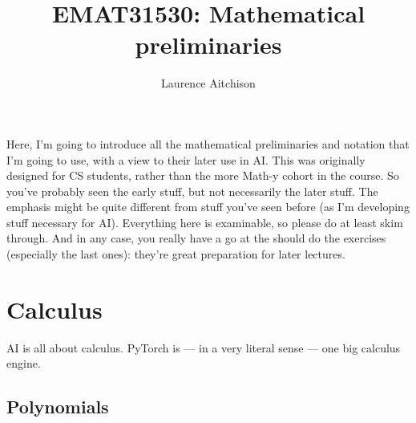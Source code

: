 \documentclass{article}
\title{EMAT31530: Mathematical preliminaries}
\author{Laurence Aitchison}
\date{}
\begin{document}
\maketitle

Here, I'm going to introduce all the mathematical preliminaries and notation that I'm going to use, with a view to their later use in AI.  This was originally designed for CS students, rather than the more Math-y cohort in the course. So you've probably seen the early stuff, but not necessarily the later stuff.  The emphasis might be quite different from stuff you've seen before (as I'm developing stuff necessary for AI).  Everything here is examinable, so please do at least skim through.  And in any case, you really have a go at the should do the exercises (especially the last ones): they're great preparation for later lectures.

\section{Calculus}

AI is all about calculus.  PyTorch is --- in a very literal sense --- one big calculus engine.

\subsection{Polynomials}
\end{document}
